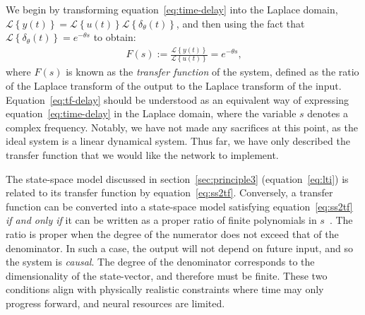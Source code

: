 We begin by transforming equation~\ref{eq:time-delay} into the Laplace domain, $\mathcal{L} \left\{ y(t) \right\} = \mathcal{L} \left\{ u(t) \right\} \mathcal{L} \left\{ \delta_{\theta}(t) \right\}$, and then using the fact that $\mathcal{L} \left\{ \delta_{\theta}(t) \right\} = e^{-\theta s}$ to obtain:
\begin{align} \label{eq:tf-delay}
F(s) := \frac{\mathcal{L} \left\{ y(t) \right\}}{\mathcal{L} \left\{ u(t) \right\}} = e^{-\theta s} \text{,}
\end{align}
where $F(s)$ is known as the \emph{transfer function} of the system, defined as the ratio of the Laplace transform of the output to the Laplace transform of the input.
Equation~\ref{eq:tf-delay} should be understood as an equivalent way of expressing equation~\ref{eq:time-delay} in the Laplace domain, where the variable $s$ denotes a complex frequency. 
Notably, we have not made any sacrifices at this point, as the ideal system is a linear dynamical system.
Thus far, we have only described the transfer function that we would like the network to implement. %

The state-space model discussed in section~\ref{sec:principle3} (equation~\ref{eq:lti}) is related to its transfer function by equation~\ref{eq:ss2tf}.
Conversely, a transfer function can be converted into a state-space model satisfying equation~\ref{eq:ss2tf} \emph{if and only if} it can be written as a proper ratio of finite polynomials in $s$~\citep{brogan1982modern}.
The ratio is proper when the degree of the numerator does not exceed that of the denominator.
In such a case, the output will not depend on future input, and so the system is \emph{causal}.
The degree of the denominator corresponds to the dimensionality of the state-vector, and therefore must be finite.
These two conditions align with physically realistic constraints where time may only progress forward, and neural resources are limited.

